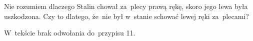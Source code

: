 \documentclass[a4paper,11pt]{article}
\numberwithin{equation}{section}
\begin{document}
\VerSpaceFour





\noindent
{} Nie rozumiem dlaczego Stalin chował za~plecy prawą rękę, skoro
jego lewa była uszkodzona. Czy to dlatego, że~nie był w~stanie schować
lewej ręki za~plecami?

\VerSpaceFour





\noindent
{} W~tekście brak odwołania do~przypisu 11.

\VerSpaceFour





\noindent
{}

\VerSpaceFour





\noindent
{}

\VerSpaceFour





\noindent
{}





\newpage


\VerSpaceFive
\end{document}
